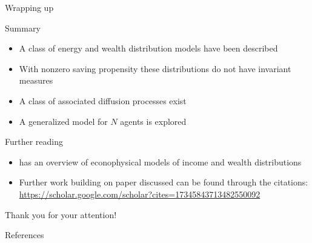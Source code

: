 \documentclass[9pt, handout]{beamer}
\begin{document}
\begin{frame}{Wrapping up}
  \begin{block}{Summary}
    \begin{itemize}
    \item A class of energy and wealth distribution models have been described
    \item With nonzero saving propensity these distributions do not have invariant measures
    \item A class of associated diffusion processes exist
    \item A generalized model for $N$ agents is explored
    \end{itemize}
  \end{block}
  \begin{block}{Further reading}
    \begin{itemize}
    \item {} has an overview of econophysical models of income and wealth distributions
    \item Further work building on paper discussed can be found through the citations: \url{https://scholar.google.com/scholar?cites=17345843713482550092}
    \end{itemize}
  \end{block}
  \pause
  \begin{center}
  \huge{
  Thank you for your attention!
  }
  \end{center}
\end{frame}

\begin{frame}[allowframebreaks]{References}

%   
%   
  \printbibliography
\end{frame}
\end{document}
